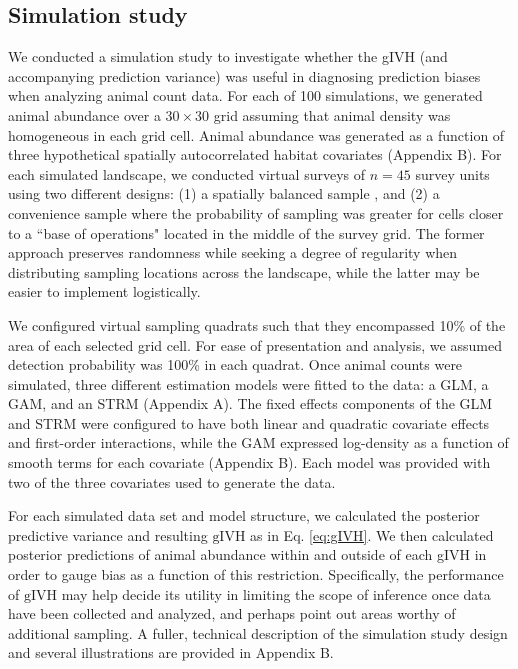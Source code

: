 \documentclass[12pt,english]{article}
\begin{document}
\begin{spacing}{1.9}
\subsection{Simulation study}


We conducted a simulation study to investigate whether the gIVH (and accompanying prediction variance) was useful in diagnosing prediction biases when analyzing animal count data. For each of 100 simulations, we generated animal abundance over a $30 \times 30$ grid assuming that animal density was homogeneous in each grid cell.  Animal abundance was generated as a function of three hypothetical spatially autocorrelated habitat covariates (Appendix B).   For each simulated landscape, we conducted virtual surveys of $n=45$ survey units using two different designs: (1) a spatially balanced sample \citep{StevensOlsen2004}, and (2) a convenience sample where the probability of sampling was greater for cells closer to a ``base of operations" located in the middle of the survey grid. The former approach preserves randomness while seeking a degree of regularity when distributing sampling locations across the landscape, while the latter may be easier to implement logistically.

We configured virtual sampling quadrats such that they encompassed 10\% of the area of each selected grid cell.  For ease of presentation and analysis, we assumed detection probability was 100\% in each quadrat.  Once animal counts were simulated, three different estimation models were fitted to the data: a GLM, a GAM, and an STRM (Appendix A).  The fixed effects components of the GLM and STRM were configured to have both linear and quadratic covariate effects and first-order interactions, while the GAM expressed log-density as a function of smooth terms for each covariate (Appendix B).  Each model was provided with two of the three covariates used to generate the data.

For each simulated data set and model structure, we calculated the posterior predictive variance and resulting $\text{gIVH}$ as in Eq. \ref{eq:gIVH}. We then calculated posterior predictions of animal abundance within and outside of each gIVH in order to gauge bias as a function of this restriction.  Specifically, the performance of $\text{gIVH}$ may help decide its utility in limiting the scope of inference once data have been collected and analyzed, and perhaps point out areas worthy of additional sampling.  A fuller, technical description of the simulation study design and several illustrations are provided in Appendix B.


\end{spacing}
\end{document}

